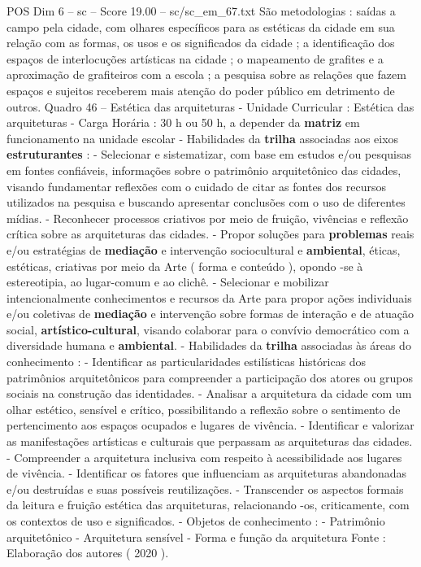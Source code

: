 \begin{textsample}{POS Dim 6 – sc – Score 19.00 – sc/sc\_em\_67.txt}
São metodologias : saídas a campo pela cidade, com olhares específicos para as estéticas da cidade em sua relação com as formas, os usos e os significados da cidade ; a identificação dos espaços de interlocuções artísticas na cidade ; o mapeamento de grafites e a aproximação de grafiteiros com a escola ; a pesquisa sobre as relações que fazem espaços e sujeitos receberem mais atenção do poder público em detrimento de outros.
Quadro 46 – Estética das arquiteturas - Unidade Curricular : Estética das arquiteturas - Carga Horária : 30 h ou 50 h, a depender da \textbf{matriz} em funcionamento na unidade escolar - Habilidades da \textbf{trilha} associadas aos eixos \textbf{estruturantes} : - Selecionar e sistematizar, com base em estudos e/ou pesquisas em fontes confiáveis, informações sobre o patrimônio arquitetônico das cidades, visando fundamentar reflexões com o cuidado de citar as fontes dos recursos utilizados na pesquisa e buscando apresentar conclusões com o uso de diferentes mídias. - Reconhecer processos criativos por meio de fruição, vivências e reflexão crítica sobre as arquiteturas das cidades. - Propor soluções para \textbf{problemas} reais e/ou estratégias de \textbf{mediação} e intervenção sociocultural e \textbf{ambiental}, éticas, estéticas, criativas por meio da Arte ( forma e conteúdo ), opondo -se à estereotipia, ao lugar-comum e ao clichê. - Selecionar e mobilizar intencionalmente conhecimentos e recursos da Arte para propor ações individuais e/ou coletivas de \textbf{mediação} e intervenção sobre formas de interação e de atuação social, \textbf{artístico-cultural}, visando colaborar para o convívio democrático com a diversidade humana e \textbf{ambiental}. - Habilidades da \textbf{trilha} associadas às áreas do conhecimento : - Identificar as particularidades estilísticas históricas dos patrimônios arquitetônicos para compreender a participação dos atores ou grupos sociais na construção das identidades. - Analisar a arquitetura da cidade com um olhar estético, sensível e crítico, possibilitando a reflexão sobre o sentimento de pertencimento aos espaços ocupados e lugares de vivência. - Identificar e valorizar as manifestações artísticas e culturais que perpassam as arquiteturas das cidades. - Compreender a arquitetura inclusiva com respeito à acessibilidade aos lugares de vivência. - Identificar os fatores que influenciam as arquiteturas abandonadas e/ou destruídas e suas possíveis reutilizações. - Transcender os aspectos formais da leitura e fruição estética das arquiteturas, relacionando -os, criticamente, com os contextos de uso e significados. - Objetos de conhecimento : - Patrimônio arquitetônico - Arquitetura sensível - Forma e função da arquitetura Fonte : Elaboração dos autores ( 2020 ).

\end{textsample}
